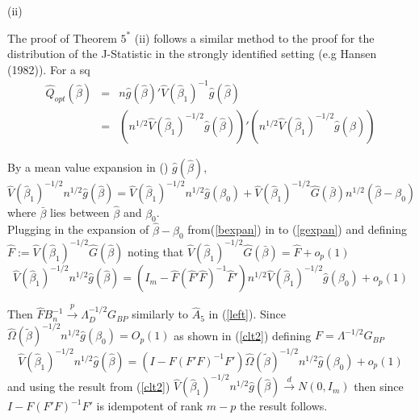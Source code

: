 \documentclass[11pt, fleqn]{article}
\begin{document}
(ii)

The proof of Theorem $5^*$ (ii) follows a similar method to the proof for the distribution of the J-Statistic in the strongly identified setting (e.g Hansen (1982)). For a sq
\begin{eqnarray} \hat{Q}_{opt}(\hat{\beta})&=&n\hat{g}(\hat{\beta})'\hat{V}(\hat{\beta}_1)^{-1}\hat{g}(\hat{\beta})\\
&=& (n^{1/2}\hat{V}(\hat{\beta}_1)^{-1/2}\hat{g}(\hat{\beta}))'(n^{1/2}\hat{V}(\hat{\beta}_1)^{-1/2}\hat{g}(\hat{\beta}))
\end{eqnarray}

By a mean value expansion  in () $\hat{g}(\hat{\beta})$,
\begin{equation} \label{gexpan} \hat{V}(\hat{\beta}_1)^{-1/2} n^{1/2}\hat{g}(\hat{\beta})=\hat{V}(\hat{\beta}_1)^{-1/2}n^{1/2}\hat{g}(\beta_0)+\hat{V}(\hat{\beta}_1)^{-1/2} \hat{G}(\bar{\beta})n^{1/2}(\hat{\beta}-\beta_0)  \end{equation}
where $\bar{\beta}$ lies between $\hat{\beta}$ and $\beta_0$.\\
Plugging in the expansion of $\hat{\beta}-\beta_0$ from(\ref{bexpan}) in to (\ref{gexpan}) and defining $\hat{F}:=\hat{V}(\hat{\beta}_1)^{-1/2}\hat{G}(\hat{\beta})$ noting that $\hat{V}(\hat{\beta}_1)^{-1/2}\hat{G}(\bar{\beta})=\hat{F}+o_p(1)$
\begin{equation} \hat{V}(\hat{\beta}_1)^{-1/2} n^{1/2}\hat{g}(\hat{\beta})=(I_m-\hat{F}(\hat{F}'\hat{F})^{-1}\hat{F}')n^{1/2} \hat{V}(\hat{\beta}_1)^{-1/2} \hat{g}(\beta_0) +o_p(1)\end{equation}

Then $\hat{F}B_n^{-1}\overset{p}{\rightarrow}\Lambda_D^{-1/2}G_{BP}$ similarly to $\hat{A}_5$ in (\ref{left}).
Since $\hat{\Omega}(\tilde{\beta})^{-1/2} n^{1/2}\hat{g}(\beta_0)=O_p(1)$ as shown in (\ref{clt2}) defining $F=\Lambda^{-1/2}G_{BP}$
\begin{equation}\hat{V}(\hat{\beta}_1)^{-1/2} n^{1/2}\hat{g}(\hat{\beta})= (I-F(F'F)^{-1}F')\hat{\Omega}(\tilde{\beta})^{-1/2} n^{1/2}\hat{g}(\beta_0)+o_p(1)\end{equation}
and using the result from (\ref{clt2}) $\hat{V}(\hat{\beta}_1)^{-1/2} n^{1/2}\hat{g}(\hat{\beta})\overset{d}{\rightarrow} N(0,I_m)$ then since $I-F(F'F)^{-1}F'$ is idempotent of rank $m-p$ the result follows.\\




 
\end{document}
